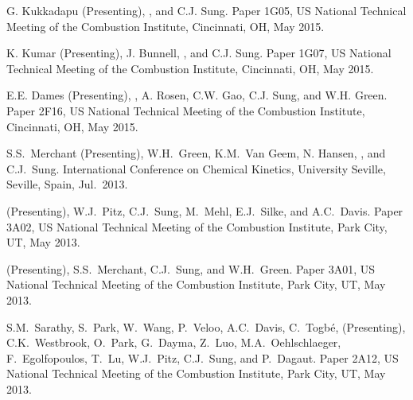 \begin{bibmune}
\item G. Kukkadapu (Presenting), , and C.J. Sung. 
        Paper 1G05,  US National Technical Meeting of the
        Combustion Institute, Cincinnati, OH, May 2015.

\item K. Kumar (Presenting), J. Bunnell, , and C.J. Sung.
        Paper 1G07,  US National Technical Meeting of the
        Combustion Institute, Cincinnati, OH, May 2015.

\item E.E. Dames (Presenting), , A. Rosen, C.W. Gao, C.J. Sung,
        and W.H. Green. 
        Paper 2F16,  US National Technical Meeting of the
        Combustion Institute, Cincinnati, OH, May 2015.

\item S.S.\ Merchant (Presenting), W.H.\ Green, K.M.\ Van Geem, N.
        Hansen, , and C.J.\ Sung.
          International
        Conference on Chemical Kinetics, University Seville, Seville,
        Spain, Jul.\ 2013.

\item {} (Presenting), W.J.\ Pitz, C.J.\ Sung, M.\ Mehl,
        E.J.\ Silke, and A.C.\ Davis. 
        Paper 3A02,  US National Technical Meeting of the
        Combustion Institute, Park City, UT, May 2013.

\item {} (Presenting), S.S.\ Merchant, C.J.\ Sung, and W.H.\ Green.
         Paper 3A01,  US National Technical
        Meeting of the Combustion Institute, Park City, UT, May 2013.

\item S.M.\ Sarathy, S.\ Park, W.\ Wang, P.\ Veloo, A.C.\ Davis,
        C.\ Togbé,  (Presenting), C.K.\ Westbrook, O.\ Park,
        G.\ Dayma, Z.\ Luo, M.A.\ Oehlschlaeger, F.\ Egolfopoulos, T.\ Lu,
        W.J.\ Pitz, C.J.\ Sung, and P.\ Dagaut. 
        Paper 2A12,  US National Technical Meeting of the
        Combustion Institute, Park City, UT, May 2013.


\end{bibmune}
